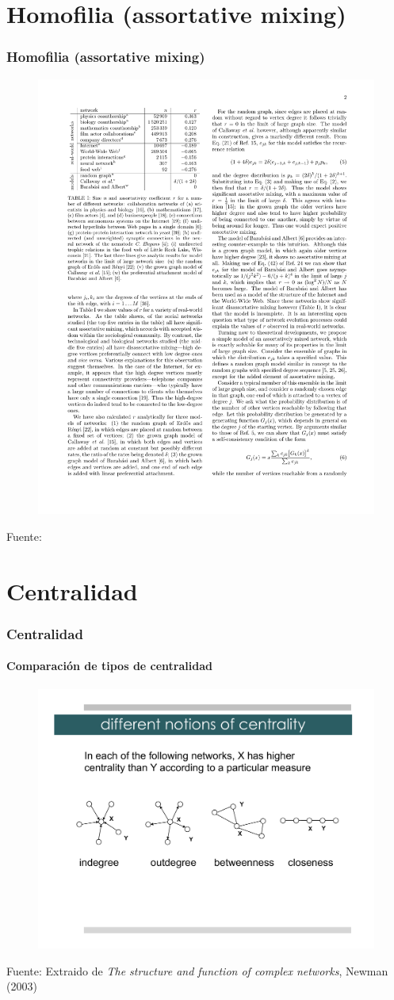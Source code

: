 \documentclass[10pt,handout]{beamer}
\begin{document}
\section{Homofilia (assortative mixing)}

\begin{frame}
\frametitle{Homofilia (assortative mixing)}
\begin{figure}
\centering
\includegraphics[trim= 1cm 16cm 11cm 1cm, clip=true, width=.5\linewidth]{assortative_mix.pdf}
\end{figure}
{\footnotesize Fuente: \cite{newman2002assortative}}
\end{frame}

\section{Centralidad}

\begin{frame}
\frametitle{Centralidad}
\framesubtitle{Comparaci\'on de tipos de centralidad}
\begin{figure}
\includegraphics[trim=2cm 6cm 2cm 4cm, clip=true, width=\linewidth]{Lecture3Acentrality_comparison.pdf}
\end{figure}
{\footnotesize Fuente: Extraido de \emph{The structure and function of complex networks}, Newman (2003) \cite{newman2003structure}}
\end{frame}
\end{document}

